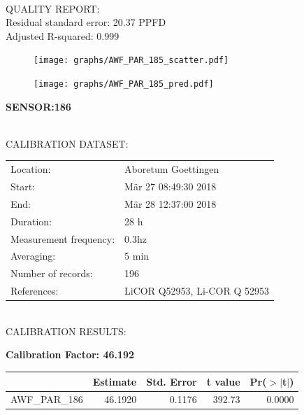 \documentclass[oneside]{report}
\begin{document}
\hrulefill\\
QUALITY REPORT:\\
Residual standard error: 20.37 PPFD\\
Adjusted R-squared: 0.999



\begin{figure}[H]
  \centering
  \texttt{[image: graphs/AWF\_PAR\_185\_scatter.pdf]}
\end{figure}




\begin{figure}[H]
  \centering
  \texttt{[image: graphs/AWF\_PAR\_185\_pred.pdf]}
\end{figure}

\pagebreak


\begin{center}
\large{\textbf{SENSOR:186}}\\
\end{center}

\hrulefill\\
CALIBRATION DATASET:\\
\begin{table}[h!]
  \centering
  \label{tab:table1}
  \begin{tabular}{ll}
    Location: & Aboretum Goettingen\\ 
    
    
    Start:  & Mär 27 08:49:30 2018 \\
    End:   & Mär 28 12:37:00 2018\\ 
    Duration: & 28 h\\
    Measurement frequency: & 0.3hz\\
    Averaging:  &5 min\\
    Number of records: & 196 \\
    References: & LiCOR Q52953, Li-COR Q 52953 \\
  \end{tabular}
\end{table}

\hrulefill\\
CALIBRATION RESULTS:\\


\begin{center}
\textbf{\large{Calibration Factor: 46.192}}\\
\end{center}
\begin{table}[ht]
\centering
\begin{tabular}{rrrrr}
  \hline
 & Estimate & Std. Error & t value & Pr($>$$|$t$|$) \\ 
  \hline
AWF\_PAR\_186 & 46.1920 & 0.1176 & 392.73 & 0.0000 \\ 
   \hline
\end{tabular}
\end{table}
\end{document}
